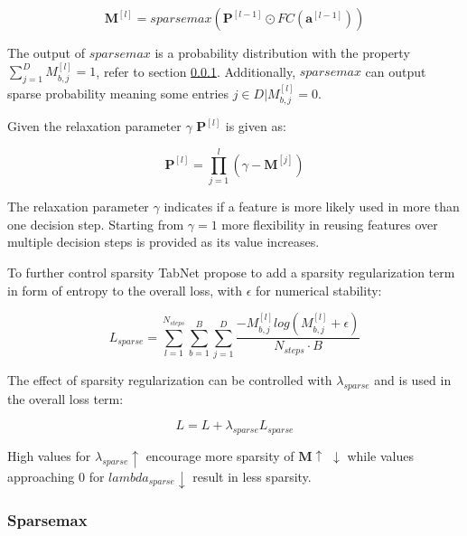 \documentclass[../main.tex]{subfiles}
\begin{document}
\begin{equation}
    \mathbf{M}^{[l]}=sparsemax(\mathbf{P}^{[l-1]} \odot FC(\mathbf{a}^{[l-1]}))
\end{equation}

The output of $sparsemax$ is a probability distribution with the property $\sum_{j=1}^{D} M^{[l]}_{b,j}=1$, refer to section \ref{sssec:sparsemax}. Additionally, $sparsemax$ can output sparse probability meaning some entries $j\in D | M^{[l]}_{b,j}=0$.

Given the relaxation parameter $\gamma$ $\mathbf{P}^{[l]}$ is given as:

\begin{equation} \label{eq:gamma}
    \mathbf{P}^{[l]}=\prod_{j=1}^{l}(\gamma - \mathbf{M}^{[j]})
\end{equation}

The relaxation parameter $\gamma$ indicates if a feature is more likely used in more than one decision step. Starting from $\gamma = 1$ more flexibility in reusing features over multiple decision steps is provided as its value increases.

To further control sparsity TabNet propose to add a sparsity regularization term in form of entropy to the overall loss, with $\epsilon$ for numerical stability:

\begin{equation} \label{eq:sparsity_regularization}
    L_{sparse}=\sum_{l=1}^{N_{steps}} \sum_{b=1}^B \sum_{j=1}^D \frac{-M^{[l]}_{b,j} log(M^{[l]}_{b,j} + \epsilon )}{N_{steps} \cdot B}
\end{equation}

The effect of sparsity regularization can be controlled with $\lambda_{sparse}$ and is used in the overall loss term:

\begin{equation} \label{eq:lambda_sparse}
    L=L+\lambda_{sparse}L_{sparse}
\end{equation}

High values for $\lambda_{sparse} \uparrow$ encourage more sparsity of $\mathbf{M} \uparrow$ $\downarrow$ while values approaching 0 for $lambda_{sparse} \downarrow$ result in less sparsity.



\subsubsection{Sparsemax} \label{sssec:sparsemax}
\end{document}
